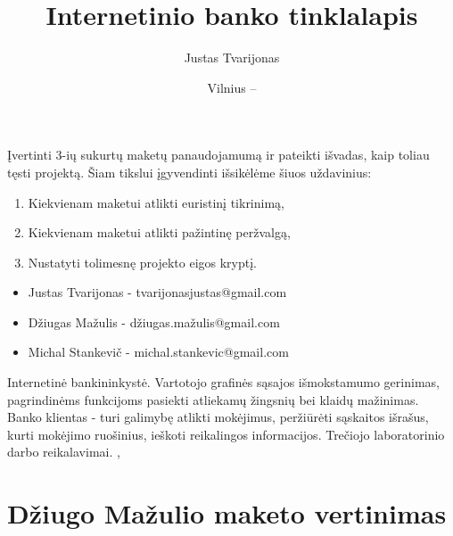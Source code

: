 \documentclass[oneside]{VUMIFPSkursinis}
\title{Internetinio banko tinklalapis}
\author{Justas Tvarijonas}
\date{Vilnius – \the\year}
\begin{document}
\maketitle
{}
Įvertinti 3-ių sukurtų maketų panaudojamumą ir pateikti išvadas, kaip toliau tęsti projektą. Šiam tikslui įgyvendinti išsikėlėme šiuos uždavinius:
\begin{enumerate}
	\item Kiekvienam maketui atlikti euristinį tikrinimą,
	\item Kiekvienam maketui atlikti pažintinę peržvalgą,
	\item Nustatyti tolimesnę projekto eigos kryptį.
\end{enumerate}
\begin{itemize}
	\item Justas Tvarijonas - tvarijonasjustas@gmail.com
	\item Džiugas Mažulis - džiugas.mažulis@gmail.com
	\item Michal Stankevič - michal.stankevic@gmail.com 
\end{itemize}
\tableofcontents
{}
Internetinė bankininkystė.
Vartotojo grafinės sąsajos išmokstamumo gerinimas, pagrindinėms funkcijoms pasiekti atliekamų žingsnių bei klaidų mažinimas.
Banko klientas - turi galimybę atlikti mokėjimus, peržiūrėti sąskaitos išrašus, kurti mokėjimo ruošinius, ieškoti reikalingos informacijos.
Trečiojo laboratorinio darbo reikalavimai.
\cite{8_Euristinis_tikrinimas.pdf},
\cite{9_Tikrinimų_organizavimas.pdf}
\section{Džiugo Mažulio maketo vertinimas}
\end{document}

